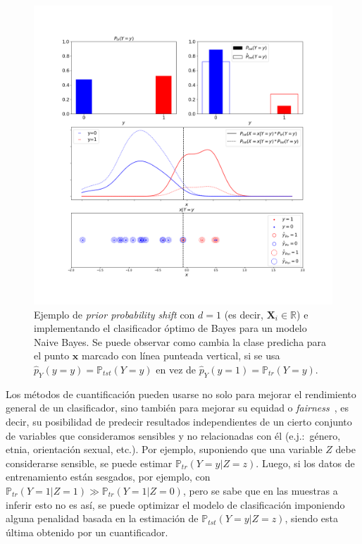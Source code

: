 \begin{figure}[!h]
    \centerline{\includegraphics[width=1.00\textwidth]{../plots_teoria/bayes_classifier.png}}
    \caption{Ejemplo de {\it prior probability shift\/} con $d=1$ (es decir,
    $\boldsymbol{X}_i \in \mathbb{R}$) e implementando el clasificador óptimo de
    Bayes para un modelo Naive Bayes. Se puede observar como cambia la clase
    predicha para el punto $\boldsymbol{x}$ marcado con línea punteada vertical,
    si se usa  $\hat p_Y(y=y) = \mathbb{P}_{tst}(Y=y)$ en vez de  $\hat p_Y(y=1)
    = \mathbb{P}_{tr}(Y=y)$.}\label{fig:bayes_classifier}
\end{figure}

Los métodos de cuantificación pueden usarse no solo para mejorar el rendimiento
general de un clasificador, sino también para mejorar su equidad o {\it
fairness\/}~\cite{biswas2021ensuring, fabris2023measuring}, es decir, su
posibilidad de predecir resultados independientes de un cierto conjunto de
variables que consideramos sensibles y no relacionadas con él (e.j.:~género,
etnia, orientación sexual, etc.). Por ejemplo, suponiendo que una variable $Z$
debe considerarse sensible, se puede estimar $\mathbb{P}_{tr}(Y=y|Z=z)$. Luego,
si los datos de entrenamiento están sesgados, por ejemplo, con
$\mathbb{P}_{tr}(Y=1|Z=1) \gg \mathbb{P}_{tr}(Y=1|Z=0)$, pero se sabe que en las
muestras a inferir esto no es así, se puede optimizar el modelo de clasificación
imponiendo alguna penalidad basada en la estimación de
$\mathbb{P}_{tst}(Y=y|Z=z)$, siendo esta última obtenido por un cuantificador.
